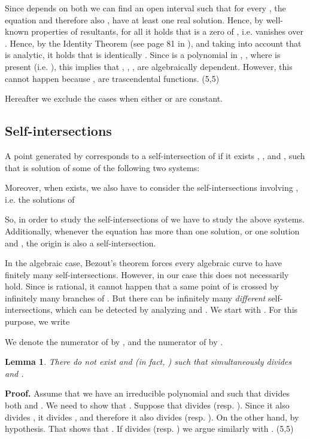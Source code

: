 \documentclass{elsart}
\def\qed{\hfill  \framebox(5,5){}}
\newtheorem{lemma}[theorem]{{\bf Lemma}}
\begin{document}
Since  depends on both  we can find an open interval  such that for every , the equation  and therefore also , have at least one real solution. Hence, by well-known properties of resultants, for all  it
holds that  is a zero of , i.e.  vanishes over . Hence, by the
Identity Theorem (see page 81 in \cite{Jong}), and taking into account that  is analytic, it holds that  is identically . Since  is a polynomial in
, ,  where  is present (i.e. ), this implies that , , , are algebraically dependent. However, this cannot happen
because ,  are trascendental functions. \qed



Hereafter we exclude the cases when either  or  are constant.

\subsection{Self-intersections}\label{subsec-self-int}

A point generated by  corresponds to a self-intersection of
 if it exists , , and , such that  is solution of some of the following two
systems:

Moreover, when  exists, we also have to consider the self-intersections involving
, i.e. the solutions of

So, in order to study the self-intersections of  we have to study the
above systems. Additionally, whenever the equation  has more than one solution, or one solution and , the origin is also a self-intersection.


In the algebraic case, Bezout's theorem forces every algebraic curve to have
finitely many self-intersections. However, in our case this does not necessarily hold.  Since  is rational, it cannot happen that a same point of  is crossed by infinitely many branches of . But there can be infinitely many {\it different} self-intersections, which can be detected by analyzing  and . We start with . For this purpose, we write







We denote the numerator of  by , and the numerator of  by .

\begin{lemma} \label{lem-inst-1}
There do not exist  and  (in fact, ) such that  simultaneously divides  and
.
\end{lemma}

{\bf Proof.} Assume that  we have an irreducible polynomial  and  such that  divides both  and .  We need to show that . Suppose that  divides  (resp. ). Since it also divides , it divides , and therefore it also divides  (resp. ).
On the other hand,  by hypothesis. That shows that .
If  divides  (resp. ) we argue similarly with . \qed
\end{document}
